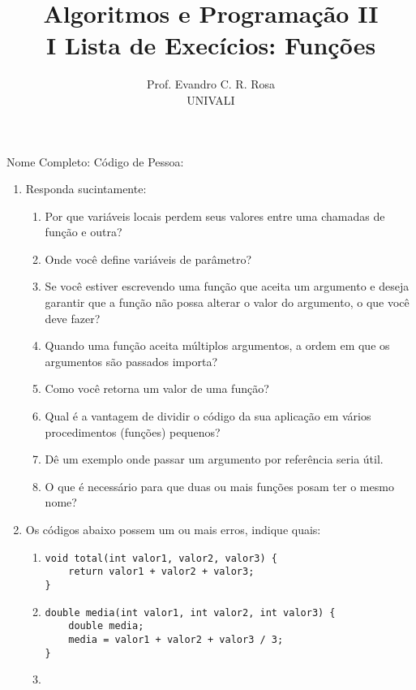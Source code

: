 \documentclass[12pt]{article}
\title{Algoritmos e Programação II\\
\large I Lista de Execícios: Funções}
\author{Prof. Evandro C. R. Rosa\\UNIVALI}
\date{}
\begin{document}
\maketitle

\noindent Nome Completo: \underline{\hspace{8.4cm}} Código de Pessoa: \underline{\hspace{2.4cm}}

\begin{enumerate}
    \item Responda sucintamente:
          \begin{enumerate}
              \item Por que variáveis locais perdem seus valores entre uma chamadas de função e outra?
              \item Onde você define variáveis de parâmetro?
              \item Se você estiver escrevendo uma função que aceita um argumento e deseja garantir que a função não possa alterar o valor do argumento, o que você deve fazer?
              \item Quando uma função aceita múltiplos argumentos, a ordem em que os argumentos são passados importa?
              \item Como você retorna um valor de uma função?
              \item Qual é a vantagem de dividir o código da sua aplicação em vários procedimentos (funções) pequenos?
              \item Dê um exemplo onde passar um argumento por referência seria útil.
              \item O que é necessário para que duas ou mais funções posam ter o mesmo nome?
          \end{enumerate}
    \item Os códigos abaixo possem um ou mais erros, indique quais:
          \begin{enumerate}
              \item \begin{verbatim}
void total(int valor1, valor2, valor3) {
    return valor1 + valor2 + valor3;
}
        \end{verbatim}
              \item \begin{verbatim}
double media(int valor1, int valor2, int valor3) {
    double media;
    media = valor1 + valor2 + valor3 / 3;
}
        \end{verbatim}
              \item \begin{verbatim}

\end{verbatim}
\end{enumerate}
\end{enumerate}
\end{document}
